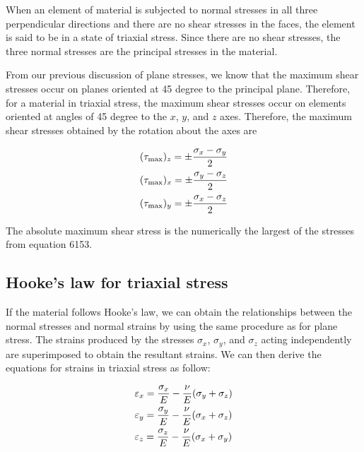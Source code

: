 \documentclass[
10pt,
a4paper,
openany,
svgnames,
]{book} %
\begin{document}
When an element of material is subjected to normal stresses in all three perpendicular directions and there are no shear stresses in the faces, the element is said to be in a state of triaxial stress. Since there are no shear stresses, the three normal stresses are the principal stresses in the material.

From our previous discussion of plane stresses, we know that the maximum shear stresses occur on planes oriented at 45 degree to the principal plane. Therefore, for a material in triaxial stress, the maximum shear stresses occur on elements oriented at angles of 45 degree to the $x$, $y$, and $z$ axes. Therefore, the maximum shear stresses obtained by the rotation about the axes are

\begin{equation}
  \begin{gathered}
    (\tau_{\max })_z =  \pm \frac{\sigma_x - \sigma_y}{2} \hfill \\
    (\tau_{\max })_x =  \pm \frac{\sigma_y - \sigma_z}{2} \hfill \\
    (\tau_{\max })_y =  \pm \frac{\sigma_x - \sigma_z}{2} \hfill \\ 
  \end{gathered}
\end{equation}

The absolute maximum shear stress is the numerically the largest of the stresses from equation 6153.

\subsection{Hooke’s law for triaxial stress}

If the material follows Hooke’s law, we can obtain the relationships between the normal stresses and normal strains by using the same procedure as for plane stress. The strains produced by the stresses $\sigma_x$, $\sigma_y$, and $\sigma_z$ acting independently are superimposed to obtain the resultant strains. We can then derive the equations for strains in triaxial stress as follow:

\begin{equation}
  \begin{gathered}
    \varepsilon_x = \frac{\sigma_x}{E} - \frac{\nu }{E}(\sigma_y + \sigma_z) \hfill \\
    \varepsilon_y = \frac{\sigma_y}{E} - \frac{\nu }{E}(\sigma_x + \sigma_z) \hfill \\
    \varepsilon_z = \frac{\sigma_z}{E} - \frac{\nu }{E}(\sigma_x + \sigma_y) \hfill 
  \end{gathered}
\end{equation}
\end{document}
